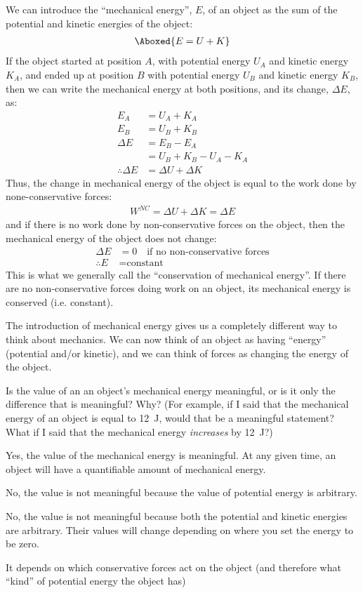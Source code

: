 We can introduce the ``mechanical energy'', $E$, of an object as the sum of the potential and kinetic energies of the object:
\begin{align}
\Aboxed{E = U+K}
\end{align}
If the object started at position $A$, with potential energy $U_A$ and kinetic energy $K_A$, and ended up at position $B$ with potential energy $U_B$ and kinetic energy $K_B$, then we can write the mechanical energy at both positions, and its change, $\Delta E$, as:
\begin{align*}
E_A &= U_A + K_A\\
E_B &= U_B + K_B\\
\Delta E &= E_B - E_A \\
&= U_B + K_B - U_A - K_A\\
\therefore \Delta E &= \Delta U + \Delta K
\end{align*}
Thus, the change in mechanical energy of the object is equal to the work done by none-conservative forces:
\begin{align*}
W^{NC} = \Delta U + \Delta K = \Delta E
\end{align*}
and if there is no work done by non-conservative forces on the object, then the mechanical energy of the object does not change:
\begin{align*}
\Delta E &= 0\quad\text{if no non-conservative forces}\\
\therefore E &= \text{constant}
\end{align*}
This is what we generally call the ``conservation of mechanical energy''. If there are no non-conservative forces doing work on an object, its mechanical energy is conserved (i.e. constant). 

The introduction of mechanical energy gives us a completely different way to think about mechanics. We can now think of an object as having ``energy'' (potential and/or kinetic), and we can think of forces as changing the energy of the object.

\begin{checkpoint}
\begin{MCquestion}{Is the value of an an object's mechanical energy meaningful, or is it only the difference that is meaningful? Why? (For example, if I said that the mechanical energy of an object is equal to \SI{12}{J}, would that be a meaningful statement? What if I said that the mechanical energy \textit{increases} by \SI{12}{J}?)}
\item Yes, the value of the mechanical energy is meaningful. At any given time, an object will have a quantifiable amount of mechanical energy.
\item No, the value is not meaningful because the value of potential energy is arbitrary. \correct
\item No, the value is not meaningful because both the potential and kinetic energies are arbitrary. Their values will change depending on where you set the energy to be zero.
\item It depends on which conservative forces act on the object (and therefore what ``kind'' of potential energy the object has)
\end{MCquestion}
\end{checkpoint}

